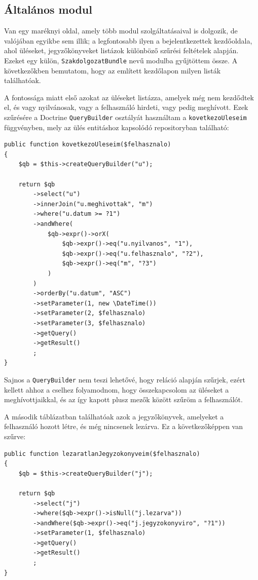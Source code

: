 \documentclass[a4paper,12pt,oneside]{report}
\begin{document}
\subsection{Általános modul}

Van egy maréknyi oldal, amely több modul szolgáltatásaival is dolgozik, de valójában egyikbe sem illik; a legfontosabb ilyen a bejelentkezettek kezdőoldala, ahol üléseket, jegyzőkönyveket listázok különböző szűrési feltételek alapján. Ezeket egy külön, {\tt SzakdolgozatBundle} nevű modulba gyűjtöttem össze. A következőkben bemutatom, hogy az említett kezdőlapon milyen listák találhatóak.

A fontossága miatt első azokat az üléseket listázza, amelyek még nem kezdődtek el, és vagy nyilvánosak, vagy a felhasználó hirdeti, vagy pedig meghívott. Ezek szűrésére a Doctrine {\tt QueryBuilder} osztályát használtam a {\tt kovetkezoUleseim} függvényben, mely az ülés entitáshoz kapsolódó repositoryban található:

\begin{lstlisting}
public function kovetkezoUleseim($felhasznalo)
{
    $qb = $this->createQueryBuilder("u");

    return $qb
        ->select("u")
        ->innerJoin("u.meghivottak", "m")
        ->where("u.datum >= ?1")
        ->andWhere(
            $qb->expr()->orX(
                $qb->expr()->eq("u.nyilvanos", "1"),
                $qb->expr()->eq("u.felhasznalo", "?2"),
                $qb->expr()->eq("m", "?3")
            )
        )
        ->orderBy("u.datum", "ASC")
        ->setParameter(1, new \DateTime())
        ->setParameter(2, $felhasznalo)
        ->setParameter(3, $felhasznalo)
        ->getQuery()
        ->getResult()
        ;
}
\end{lstlisting}

Sajnos a {\tt QueryBuilder} nem teszi lehetővé, hogy reláció alapján szűrjek, ezért kellett ahhoz a cselhez folyamodnom, hogy összekapcsolom az üléseket a meghívottjaikkal, és az így kapott plusz mezők között szűröm a felhasználót.

A második táblázatban találhatóak azok a jegyzőkönyvek, amelyeket a felhasználó hozott létre, és még nincsenek lezárva. Ez a következőképpen van szűrve:

\begin{lstlisting}
public function lezaratlanJegyzokonyveim($felhasznalo)
{
    $qb = $this->createQueryBuilder("j");

    return $qb
        ->select("j")
        ->where($qb->expr()->isNull("j.lezarva"))
        ->andWhere($qb->expr()->eq("j.jegyzokonyviro", "?1"))
        ->setParameter(1, $felhasznalo)
        ->getQuery()
        ->getResult()
        ;
}
\end{lstlisting}
\end{document}
